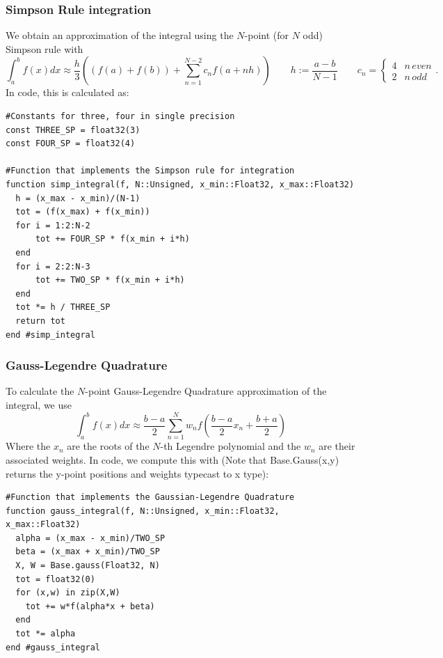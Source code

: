 \documentclass{article}
\begin{document}
\subsubsection{Simpson Rule integration}
We obtain an approximation of the integral using the $N$-point (for $N$ odd) Simpson rule with
$$\int_a^bf(x)dx \approx \frac{h}{3}((f(a) + f(b)) + \sum\limits_{n=1}^{N-2}c_nf(a+nh)) \qquad h := \frac{a-b}{N-1} \qquad c_n = \begin{cases} 4 & n\, even \\ 2 & n \, odd\end{cases}.$$
In code, this is calculated as:
\begin{lstlisting}
#Constants for three, four in single precision
const THREE_SP = float32(3)
const FOUR_SP = float32(4)

#Function that implements the Simpson rule for integration
function simp_integral(f, N::Unsigned, x_min::Float32, x_max::Float32)
  h = (x_max - x_min)/(N-1)
  tot = (f(x_max) + f(x_min))
  for i = 1:2:N-2
      tot += FOUR_SP * f(x_min + i*h)
  end
  for i = 2:2:N-3
      tot += TWO_SP * f(x_min + i*h)
  end
  tot *= h / THREE_SP
  return tot
end #simp_integral
\end{lstlisting}
\subsubsection{Gauss-Legendre Quadrature}
To calculate the $N$-point Gauss-Legendre Quadrature approximation of the integral, we use
$$\int_a^bf(x)dx \approx \frac{b-a}{2}\sum\limits_{n=1}^Nw_nf(\frac{b-a}{2}x_n + \frac{b+a}{2})$$
Where the $x_n$ are the roots of the $N$-th Legendre polynomial and the $w_n$ are their associated weights.
In code, we compute this with (Note that Base.Gauss(x,y) returns the y-point positions and weights typecast to x type):
\begin{lstlisting}
#Function that implements the Gaussian-Legendre Quadrature
function gauss_integral(f, N::Unsigned, x_min::Float32, x_max::Float32)
  alpha = (x_max - x_min)/TWO_SP
  beta = (x_max + x_min)/TWO_SP
  X, W = Base.gauss(Float32, N)
  tot = float32(0)
  for (x,w) in zip(X,W)
    tot += w*f(alpha*x + beta)
  end
  tot *= alpha
end #gauss_integral
\end{lstlisting}
\end{document}
